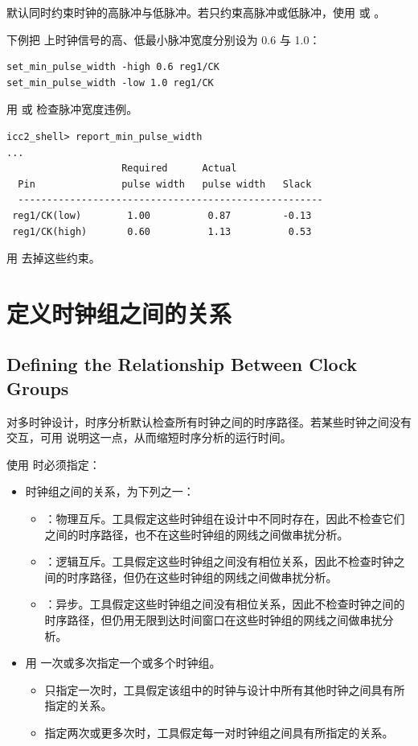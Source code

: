 默认同时约束时钟的高脉冲与低脉冲。若只约束高脉冲或低脉冲，使用  或 。

下例把  上时钟信号的高、低最小脉冲宽度分别设为 0.6 与 1.0：
\begin{lstlisting}
set_min_pulse_width -high 0.6 reg1/CK
set_min_pulse_width -low 1.0 reg1/CK
\end{lstlisting}

用  或  检查脉冲宽度违例。
\begin{lstlisting}
icc2_shell> report_min_pulse_width
...
                    Required      Actual
  Pin               pulse width   pulse width   Slack
  -----------------------------------------------------
 reg1/CK(low)        1.00          0.87         -0.13
 reg1/CK(high)       0.60          1.13          0.53
\end{lstlisting}

用  去掉这些约束。

\section{定义时钟组之间的关系}
\subsection*{Defining the Relationship Between Clock Groups}

对多时钟设计，时序分析默认检查所有时钟之间的时序路径。若某些时钟之间没有交互，可用  说明这一点，从而缩短时序分析的运行时间。

使用  时必须指定：
\begin{itemize}
  \item 时钟组之间的关系，为下列之一：
  \begin{itemize}
    \item {}：物理互斥。工具假定这些时钟组在设计中不同时存在，因此不检查它们之间的时序路径，也不在这些时钟组的网线之间做串扰分析。
    \item {}：逻辑互斥。工具假定这些时钟组之间没有相位关系，因此不检查时钟之间的时序路径，但仍在这些时钟组的网线之间做串扰分析。
    \item {}：异步。工具假定这些时钟组之间没有相位关系，因此不检查时钟之间的时序路径，但仍用无限到达时间窗口在这些时钟组的网线之间做串扰分析。
  \end{itemize}
  \item 用  一次或多次指定一个或多个时钟组。
  \begin{itemize}
    \item 只指定一次时，工具假定该组中的时钟与设计中所有其他时钟之间具有所指定的关系。
    \item 指定两次或更多次时，工具假定每一对时钟组之间具有所指定的关系。
  \end{itemize}
\end{itemize}

